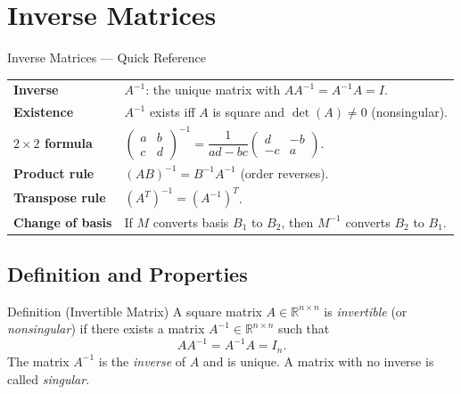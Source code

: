
\section{Inverse Matrices}

\begin{toolkitbox}{Inverse Matrices --- Quick Reference}
\begin{tabular}{@{}p{}p{}@{}}
\textbf{Inverse}          & $A^{-1}$: the unique matrix with $AA^{-1} = A^{-1}A = I$. \\[4pt]
\textbf{Existence}        & $A^{-1}$ exists iff $A$ is square and $\det(A) \neq 0$ (nonsingular). \\[4pt]
\textbf{$2\times 2$ formula} & $\begin{pmatrix} a & b \\ c & d \end{pmatrix}^{-1} = \dfrac{1}{ad-bc}\begin{pmatrix} d & -b \\ -c & a \end{pmatrix}$. \\[8pt]
\textbf{Product rule}     & $(AB)^{-1} = B^{-1}A^{-1}$ (order reverses). \\[4pt]
\textbf{Transpose rule}   & $(A^T)^{-1} = (A^{-1})^T$. \\[4pt]
\textbf{Change of basis}  & If $M$ converts basis $B_1$ to $B_2$, then $M^{-1}$ converts $B_2$ to $B_1$. \\
\end{tabular}
\end{toolkitbox}

\subsection*{Definition and Properties}

\begin{propositionbox}{Definition (Invertible Matrix)}
A square matrix $A \in \mathbb{R}^{n \times n}$ is \emph{invertible}
(or \emph{nonsingular}) if there exists a matrix $A^{-1} \in \mathbb{R}^{n \times n}$
such that
\[
  AA^{-1} = A^{-1}A = I_n.
\]
The matrix $A^{-1}$ is the \emph{inverse} of $A$ and is unique.
A matrix with no inverse is called \emph{singular}.
\end{propositionbox}

